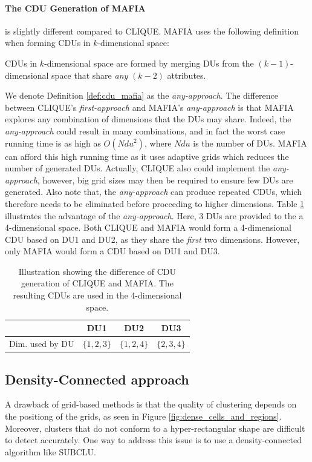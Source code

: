 \paragraph{The CDU Generation of MAFIA}
is slightly different compared to CLIQUE. MAFIA uses the following definition when forming CDUs in $k$-dimensional space:
\begin{definition}\label{def:cdu_mafia}
    CDUs in $k$-dimensional space are formed by merging DUs from the $(k-1)$-dimensional space that share \textit{any} $(k-2)$ attributes.
\end{definition}
We denote Definition \ref{def:cdu_mafia} as the \textit{any-approach}. The difference between CLIQUE's \textit{first-approach} and MAFIA's \textit{any-approach} is that MAFIA explores any combination of dimensions that the DUs may share. Indeed, the \textit{any-approach} could result in many combinations, and in fact the worst case running time is as high as $O(Ndu^2)$, where $Ndu$ is the number of DUs. MAFIA can afford this high running time as it uses adaptive grids which reduces the number of generated DUs. Actually, CLIQUE also could implement the \textit{any-approach}, however, big grid sizes may then be required to ensure few DUs are generated. Also note that, the \textit{any-approach} can produce repeated CDUs, which therefore needs to be eliminated before proceeding to higher dimensions. Table \ref{tab:cdu} illustrates the advantage of the \textit{any-approach}. Here, 3 DUs are provided to the a 4-dimensional space. Both CLIQUE and MAFIA would form a 4-dimensional CDU based on DU1 and DU2, as they share the \textit{first} two dimensions. However, only MAFIA would form a CDU based on DU1 and DU3.
\begin{table}[H]
    \vspace*{-0.7cm}
    \centering
    \begin{tabular}{l|c|c|c|}
                        & DU1           & DU2           & DU3           \\ \hline
        Dim. used by DU & $\{1, 2, 3\}$ & $\{1, 2, 4\}$ & $\{2, 3, 4\}$ \\
    \end{tabular}
    \vspace*{0.2cm}
    \caption{Illustration showing the difference of CDU generation of CLIQUE and MAFIA. The resulting CDUs are used in the 4-dimensional space.}
    \label{tab:cdu}
    \vspace*{-0.7cm}
\end{table}

\subsection{Density-Connected approach}
A drawback of grid-based methods is that the quality of clustering depends on the positiong of the grids, as seen in Figure \ref{fig:dense_cells_and_regions}. Moreover, clusters that do not conform to a hyper-rectangular shape are difficult to detect accurately. One way to address this issue is to use a density-connected algorithm like SUBCLU.

